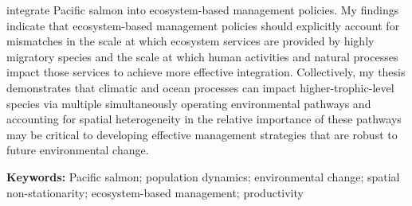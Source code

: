 integrate Pacific salmon into ecosystem-based management policies. My findings
indicate that ecosystem-based management policies should explicitly account for
mismatches in the scale at which ecosystem services are provided by highly
migratory species and the scale at which human activities and natural processes
impact those services to achieve more effective integration. Collectively, my
thesis demonstrates that climatic and ocean processes can impact
higher-trophic-level species via multiple simultaneously operating environmental
pathways and accounting for spatial heterogeneity in the relative importance of
these pathways may be critical to developing effective management strategies
that are robust to future environmental change.
\newline

\noindent \textbf{Keywords:} Pacific salmon; population dynamics; environmental
change; spatial non-stationarity; ecosystem-based management; productivity

